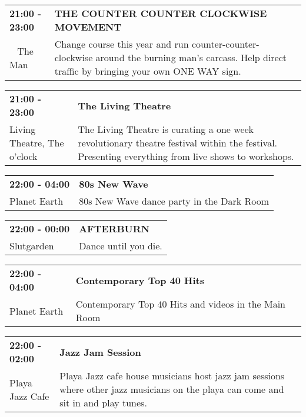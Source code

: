 \begin{tabular}{ p{1in} p{2.2in} }
    \textbf{21:00 - 23:00} & \textbf{THE COUNTER COUNTER CLOCKWISE MOVEMENT} \\
    ~ \newline The Man & Change course this year and run counter-counter-clockwise around the burning man's carcass.  Help direct traffic by bringing your own ONE WAY sign. \\
    \hline 
\end{tabular}
    
\begin{tabular}{ p{1in} p{2.2in} }
    \textbf{21:00 - 23:00} & \textbf{The Living Theatre} \\
    Living Theatre, The \newline 6 o'clock & The Living Theatre is curating a one week revolutionary theatre festival within the festival. Presenting everything from live shows to workshops. \\
    \hline 
\end{tabular}
    
\begin{tabular}{ p{1in} p{2.2in} }
    \textbf{22:00 - 04:00} & \textbf{80s New Wave} \\
    Planet Earth \newline  & 80s New Wave dance party in the Dark Room \\
    \hline 
\end{tabular}
    
\begin{tabular}{ p{1in} p{2.2in} }
    \textbf{22:00 - 00:00} & \textbf{AFTERBURN} \\
    Slutgarden \newline  & Dance until you die. \\
    \hline 
\end{tabular}
    
\begin{tabular}{ p{1in} p{2.2in} }
    \textbf{22:00 - 04:00} & \textbf{Contemporary Top 40 Hits} \\
    Planet Earth \newline  & Contemporary Top 40 Hits and videos in the Main Room \\
    \hline 
\end{tabular}
    
\begin{tabular}{ p{1in} p{2.2in} }
    \textbf{22:00 - 02:00} & \textbf{Jazz Jam Session} \\
    Playa Jazz Cafe \newline  & Playa Jazz cafe house musicians host jazz jam sessions where other jazz musicians on the playa can come and sit in and play tunes. \\
    \hline 
\end{tabular}
    
